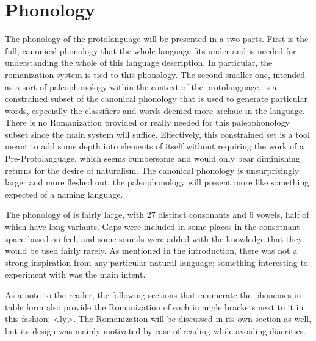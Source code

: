 \section{Phonology}
  The phonology of the protolanguage will be presented in a two parts. First is the full, canonical phonology that the whole language fits under and is needed for understanding the whole of this language description. In particular, the romanization system is tied to this phonology. The second smaller one, intended as a sort of paleophonology within the context of the protolanguage, is a constrained subset of the canonical phonology that is used to generate particular words, especially the classifiers and words deemed more archaic in the language. There is no Romanization provided or really needed for this paleophonology subset since the main system will suffice. Effectively, this constrained set is a tool meant to add some depth into elements of \langname itself without requiring the work of a Pre-Protolanguage, which seems cumbersome and would only bear diminishing returns for the desire of naturalism. The canonical phonology is unsurprisingly larger and more fleshed out; the paleophonology will present more like something expected of a naming language.\par
  The phonology of \langname is fairly large, with 27 distinct consonants and 6 vowels, half of which have long variants. Gaps were included in some places in the consotnant space based on feel, and some sounds were added with the knowledge that they would be used fairly rarely. As mentioned in the introduction, there was not a strong inspiration from any particular natural language; something interesting to experiment with was the main intent.\par 
  As a note to the reader, the following sections that enumerate the phonemes in table form also provide the Romanization of each in angle brackets next to it in this fashion: \tpall <ly>. The Romanization will be discussed in its own section as well, but its design was mainly motivated by ease of reading while avoiding diacritics.\par

